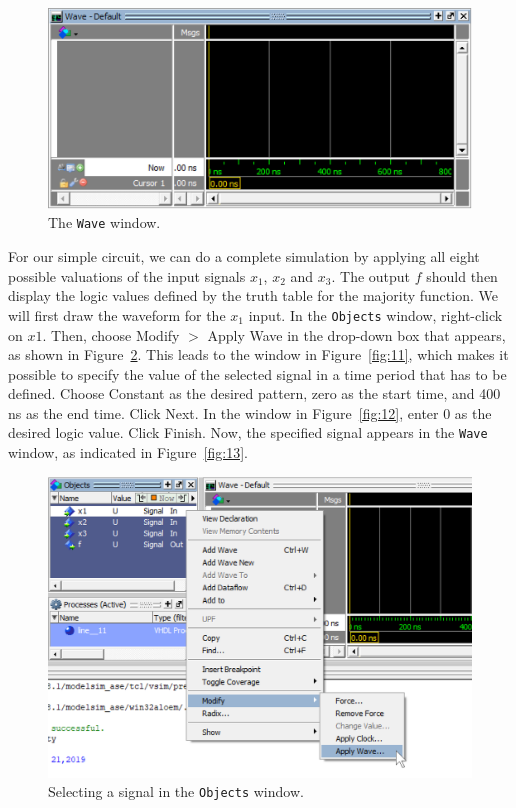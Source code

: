 \documentclass[11pt, twoside, pdftex]{article}
\begin{document}
\begin{figure}[H]
   \begin{center}
      \includegraphics[scale=0.75]{figures/figure9.png}
       \caption{The \texttt{Wave} window.} 
	 \label{fig:9}
	 \end{center}
\end{figure}

For our simple circuit, we can do a complete simulation by applying all eight possible 
valuations of the input signals $x_1$, $x_2$ and $x_3$. The output $f$ should then display 
the logic values defined by the truth table for the majority function. We will first draw 
the waveform for the $x_1$ input.  In the \texttt{Objects} window, right-click on $x1$. Then, 
choose {\sf Modify $>$ Apply Wave} in the drop-down box that appears, as shown in 
Figure~\ref{fig:10}. This leads to the window in Figure~\ref{fig:11}, which makes it possible 
to specify the value of the selected signal in a time period that has to be defined. 
Choose {\sf Constant} as the desired pattern, zero as the start time, and 400 ns as 
the end time. Click {\sf Next}. In the window in Figure~\ref{fig:12}, enter 0 as the 
desired logic value. Click {\sf Finish}.  Now, the specified signal appears in the \texttt{Wave} 
window, as indicated in Figure~\ref{fig:13}.

\begin{figure}[H]
   \begin{center}
      \includegraphics[scale=0.75]{figures/figure10.png}
       \caption{Selecting a signal in the \texttt{Objects} window.} 
	 \label{fig:10}
	 \end{center}
\end{figure}
\end{document}
